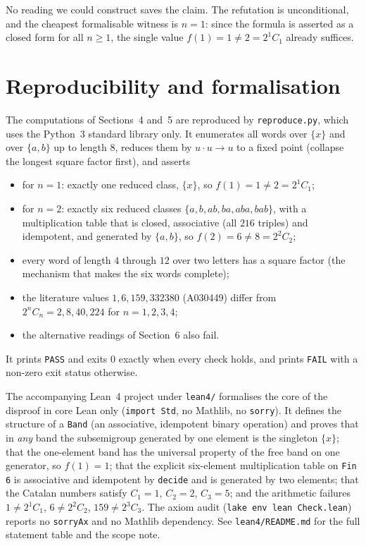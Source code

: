 \documentclass[11pt]{article}
\theoremstyle{definition}
\theoremstyle{remark}
\begin{document}
No reading we could construct saves the claim. The refutation is unconditional,
and the cheapest formalisable witness is $n = 1$: since the formula is asserted
as a closed form for all $n \ge 1$, the single value $f(1) = 1 \ne 2 = 2^1 C_1$
already suffices.

\section{Reproducibility and formalisation}

The computations of Sections~4 and~5 are reproduced by
\texttt{reproduce.py}, which uses the Python~3 standard library only. It
enumerates all words over $\{x\}$ and over $\{a,b\}$ up to length $8$, reduces
them by $u \cdot u \to u$ to a fixed point (collapse the longest square factor
first), and asserts

\begin{itemize}
\item for $n = 1$: exactly one reduced class, $\{x\}$, so $f(1) = 1 \ne 2 =
2^1 C_1$;
\item for $n = 2$: exactly six reduced classes $\{a,b,ab,ba,aba,bab\}$, with a
multiplication table that is closed, associative (all $216$ triples) and
idempotent, and generated by $\{a,b\}$, so $f(2) = 6 \ne 8 = 2^2 C_2$;
\item every word of length $4$ through $12$ over two letters has a square
factor (the mechanism that makes the six words complete);
\item the literature values $1, 6, 159, 332380$ (A030449) differ from
$2^n C_n = 2, 8, 40, 224$ for $n = 1, 2, 3, 4$;
\item the alternative readings of Section~6 also fail.
\end{itemize}

\noindent
It prints \texttt{PASS} and exits $0$ exactly when every check holds, and prints
\texttt{FAIL} with a non-zero exit status otherwise.

The accompanying Lean~4 project under \texttt{lean4/} formalises the core of the
disproof in core Lean only (\texttt{import Std}, no Mathlib, no \texttt{sorry}).
It defines the structure of a \texttt{Band} (an associative, idempotent binary
operation) and proves that in \emph{any} band the subsemigroup generated by one
element is the singleton $\{x\}$; that the one-element band has the universal
property of the free band on one generator, so $f(1) = 1$; that the explicit
six-element multiplication table on \texttt{Fin 6} is associative and idempotent
by \texttt{decide} and is generated by two elements; that the Catalan numbers
satisfy $C_1 = 1$, $C_2 = 2$, $C_3 = 5$; and the arithmetic failures
$1 \ne 2^1 C_1$, $6 \ne 2^2 C_2$, $159 \ne 2^3 C_3$. The axiom audit
(\texttt{lake env lean Check.lean}) reports no \texttt{sorryAx} and no Mathlib
dependency. See \texttt{lean4/README.md} for the full statement table and the
scope note.
\end{document}
